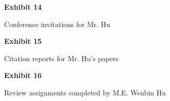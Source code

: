 \documentclass{article}
\begin{document}
% 


\vspace*{\fill}
\begin{center}

{\LARGE \bf
Exhibit 14
}

\vspace{10\baselineskip}

{\large Conference invitations for Mr. Hu}

\end{center}
\vspace*{\fill}

% 

% 

% 

% 

% 


\vspace*{\fill}
\begin{center}

{\LARGE \bf
Exhibit 15
}

\vspace{10\baselineskip}

{\large Citation reports for Mr. Hu’s papers}

\end{center}
\vspace*{\fill}

% 


\vspace*{\fill}
\begin{center}

{\LARGE \bf
Exhibit 16
}

\vspace{10\baselineskip}

{\large  Review assignments completed by M.E. Wenbin Hu}

\end{center}
\vspace*{\fill}
\end{document}
